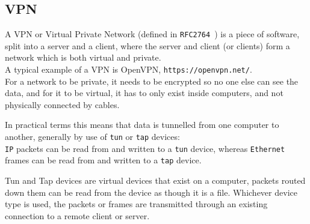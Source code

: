 \subsection{VPN}
A VPN or Virtual Private Network (defined in \texttt{RFC2764}~\cite{rfc2764}) is a piece of software, split into a server and a client, where the server and client (or clients) form a network which is both virtual and private.\\
A typical example of a VPN is OpenVPN, \texttt{https://openvpn.net/}.\\
For a network to be private, it needs to be encrypted so no one else can see the data, and for it to be virtual, it has to only exist inside computers, and not physically connected by cables.\par In practical terms this means that data is tunnelled from one computer to another, generally by use of \texttt{tun} or \texttt{tap} devices:\\
\texttt{IP} packets can be read from and written to a \texttt{tun} device, whereas \texttt{Ethernet} frames can be read from and written to a \texttt{tap} device.\par
Tun and Tap devices are virtual devices that exist on a computer, packets routed down them can be read from the device as though it is a file.
Whichever device type is used, the packets or frames are transmitted through an existing connection to a remote client or server.
